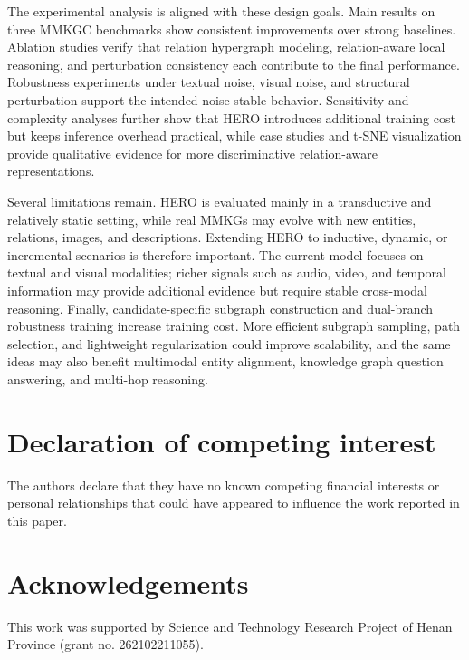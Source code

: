 \documentclass[pdflatex,sn-mathphys-num]{sn-jnl}
\begin{document}
The experimental analysis is aligned with these design goals. Main results on three MMKGC benchmarks show consistent improvements over strong baselines. Ablation studies verify that relation hypergraph modeling, relation-aware local reasoning, and perturbation consistency each contribute to the final performance. Robustness experiments under textual noise, visual noise, and structural perturbation support the intended noise-stable behavior. Sensitivity and complexity analyses further show that HERO introduces additional training cost but keeps inference overhead practical, while case studies and t-SNE visualization provide qualitative evidence for more discriminative relation-aware representations.

Several limitations remain. HERO is evaluated mainly in a transductive and relatively static setting, while real MMKGs may evolve with new entities, relations, images, and descriptions. Extending HERO to inductive, dynamic, or incremental scenarios is therefore important. The current model focuses on textual and visual modalities; richer signals such as audio, video, and temporal information may provide additional evidence but require stable cross-modal reasoning. Finally, candidate-specific subgraph construction and dual-branch robustness training increase training cost. More efficient subgraph sampling, path selection, and lightweight regularization could improve scalability, and the same ideas may also benefit multimodal entity alignment, knowledge graph question answering, and multi-hop reasoning.



\section*{Declaration of competing interest}
The authors declare that they have no known competing financial
interests or personal relationships that could have appeared to influence
the work reported in this paper.


\section*{Acknowledgements}
This work was supported by Science and Technology Research Project of Henan Province (grant no. 262102211055).


\end{document}
